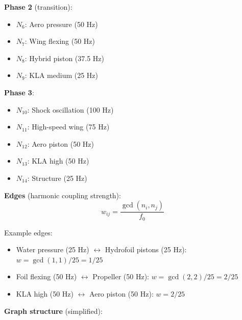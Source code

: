 \documentclass[12pt,a4paper]{article}
\begin{document}
\textbf{Phase 2} (transition):
\begin{itemize}
\item $N_6$: Aero pressure (50 Hz)
\item $N_7$: Wing flexing (50 Hz)
\item $N_8$: Hybrid piston (37.5 Hz)
\item $N_9$: KLA medium (25 Hz)
\end{itemize}

\textbf{Phase 3}:
\begin{itemize}
\item $N_{10}$: Shock oscillation (100 Hz)
\item $N_{11}$: High-speed wing (75 Hz)
\item $N_{12}$: Aero piston (50 Hz)
\item $N_{13}$: KLA high (50 Hz)
\item $N_{14}$: Structure (25 Hz)
\end{itemize}

\textbf{Edges} (harmonic coupling strength):
\begin{equation}
w_{ij} = \frac{\gcd(n_i, n_j)}{f_0}
\end{equation}

Example edges:
\begin{itemize}
\item Water pressure (25 Hz) $\leftrightarrow$ Hydrofoil pistons (25 Hz): $w = \gcd(1,1)/25 = 1/25$
\item Foil flexing (50 Hz) $\leftrightarrow$ Propeller (50 Hz): $w = \gcd(2,2)/25 = 2/25$
\item KLA high (50 Hz) $\leftrightarrow$ Aero piston (50 Hz): $w = 2/25$
\end{itemize}

\textbf{Graph structure} (simplified):
\end{document}
